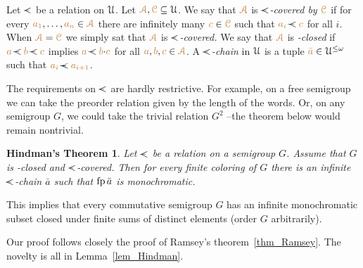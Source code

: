 % 
% 
\bigskip
Let \emph{$\cpaw$\/} be a relation on $\EuScript U$.
Let ${\color{brown}\EuScript A},{\color{brown}\EuScript C}\subseteq\EuScript U$.
We say that ${\color{brown}\EuScript A}$ is \emph{$\cpaw$-covered by ${\color{brown}\EuScript C}$\/} 
if for every ${\color{brown} a_1},\dots,{\color{brown} a_n}\in{\color{brown}\EuScript A}$ there are infinitely many ${\color{brown} c}\in{\color{brown}\EuScript C}$ such that ${\mr a_i}\cpaw{\mr c}$ for all $i$.
When ${\color{brown}\EuScript A}={\color{brown}\EuScript C}$ we simply sat that ${\color{brown}\EuScript A}$ is \emph{$\cpaw$-covered.}
We say that ${\color{brown}\EuScript A}$ is \emph{\cpawdot-closed\/} 
if ${\mr a}\cpaw{\mr b}\cpaw{\mr c}$ implies ${\mr a}\cpaw{\mr b}{\cdot}{\mr c}$ 
for all ${\color{brown} a},{\color{brown} b},{\color{brown} c}\in{\color{brown}\EuScript A}$.
A \emph{$\cpaw$-chain\/} in $\EuScript U$ is a tuple ${\color{brown}\bar a}\in\EuScript U^{\le\omega}$ such that ${\mr a_i}\cpaw{\mr a_{i+1}}$.

The requirements on  $\cpaw$ are hardly restrictive.
For example, on a free semigroup we can take the preorder relation given by the length of the words.
%
Or, on any semigroup $G$, we could take the trivial relation $G^2$ --the theorem below would remain nontrivial.

\theoremstyle{mio}
\newtheorem{Hindman}[thm]{Hindman's Theorem}
\begin{Hindman}\label{thm_Hindman}
Let $\cpaw$ be a relation on a semigroup $G$.
%
Assume that $G$ is  \cpawdot-closed and $\cpaw$-covered.
%
Then for every finite coloring of $G$ 
there is an infinite $\cpaw$-chain $\bar a$ such that ${\rm fp}\,\bar a$ is monochromatic.
\end{Hindman}

This implies that every commutative semigroup $G$ has an infinite monochromatic subset closed under finite sums of distinct elements (order $G$ arbitrarily).

Our proof follows closely the proof of Ramsey's theorem~\ref{thm_Ramsey}.
%
The novelty is all in Lemma~\ref{lem_Hindman}.

